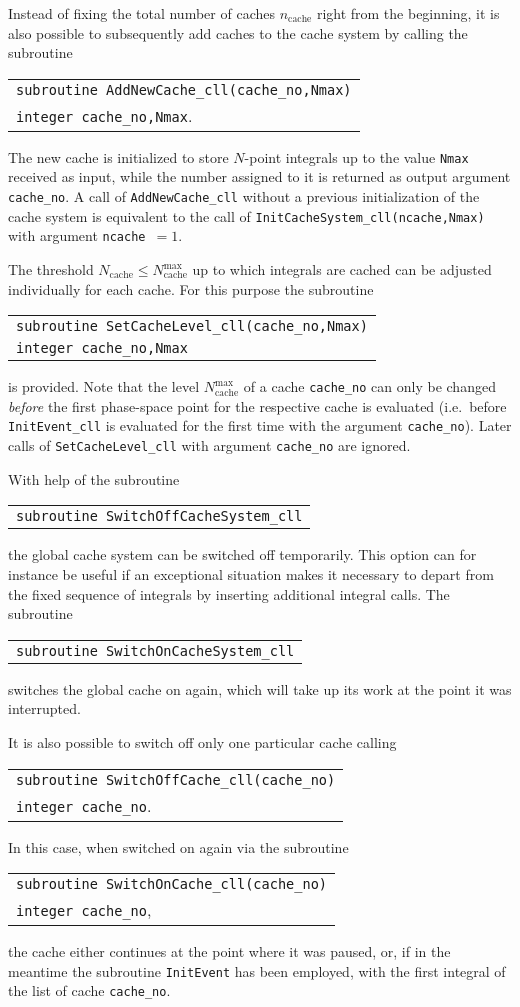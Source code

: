 \documentclass[preprint,sort&compress,12pt]{elsarticle}
\makeatletter
\def\bce{\begin{center}}
\def\ece{\end{center}}
\def\ie{i.e.\ }
\newlength{\parwidth}\newlength{\colonewidth}%
\newcommand{\cpcsub}[1]
{%
\setlength{\parwidth}{\textwidth}\addtolength{\parwidth}{-2.1em}%
\bce
\begin{tabular}[t]{@{}p{\parwidth}@{}}
#1
\end{tabular}
\ece
}%
\makeatother
\begin{document}
Instead of fixing the total number of caches $n_\textrm{cache}$ right from the beginning, it is also possible to subsequently add caches
to the cache system by calling the subroutine
\cpcsub{
{\tt subroutine  AddNewCache\_cll(cache\_no,Nmax)}\\
{\tt integer cache\_no,Nmax}\;. \\
}
The new cache is initialized to store $N$-point integrals up to the value {\tt Nmax} received as input, while the
number assigned to it is returned as output argument {\tt cache\_no}. A call of {\tt AddNewCache\_cll} without a previous initialization
of the cache system is equivalent to the call of  {\tt InitCacheSystem\_cll(ncache,Nmax)} with argument {\tt ncache\,$=1$}.

The threshold $N_\textrm{cache}\le N^\textrm{max}_\textrm{cache}$ up to which integrals are cached can be adjusted individually for each cache. 
For this purpose the subroutine
\cpcsub{
{\tt subroutine  SetCacheLevel\_cll(cache\_no,Nmax)}\\
{\tt integer cache\_no,Nmax} \\
}
is provided.
Note that the level $N^\textrm{max}_\textrm{cache}$ of a cache {\tt cache\_no} can only be changed {\it before} 
the first phase-space point for the respective cache is evaluated
(\ie before {\tt InitEvent\_cll} is evaluated for the first time with the argument
{\tt cache\_no}). Later calls of {\tt SetCacheLevel\_cll} with argument {\tt cache\_no}
are ignored.


With help of the subroutine
\cpcsub{
{\tt subroutine  SwitchOffCacheSystem\_cll}
}
the global cache system can be switched off temporarily. This option
can for instance be useful if an exceptional situation makes it
necessary to depart from the fixed sequence of integrals by inserting
additional integral calls.  The subroutine
\cpcsub{
{\tt subroutine  SwitchOnCacheSystem\_cll}
}
switches the global cache on again,
which will take up its work at the point it was interrupted.

It is also possible to switch off only one particular cache calling
\cpcsub{
{\tt subroutine  SwitchOffCache\_cll(cache\_no)}\\
{\tt integer cache\_no}\;. \\
}
In this case, when switched on again via the subroutine 
\cpcsub{
{\tt subroutine  SwitchOnCache\_cll(cache\_no)}\\
{\tt integer cache\_no}\;, \\
}
the cache either continues at the point where it was paused, or, if in the meantime the subroutine {\tt InitEvent} has
been employed, with the first integral of the list of cache {\tt cache\_no}.
\end{document}
